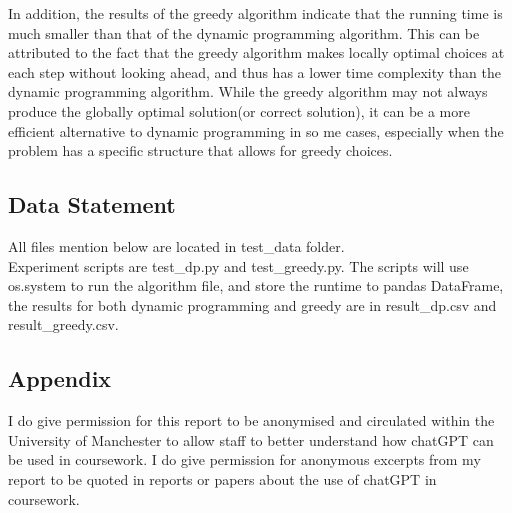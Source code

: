\documentclass[a4]{article}
\begin{document}
\noindent In addition, the results of the greedy algorithm indicate that the running time is much smaller than that of the dynamic programming algorithm. This can be attributed to the fact that the greedy algorithm makes locally optimal choices at each step without looking ahead, and thus has a lower time complexity than the dynamic programming algorithm. While the greedy algorithm may not always produce the globally optimal solution(or correct solution), it can be a more efficient alternative to dynamic programming in so me cases, especially when the problem has a specific structure that allows for greedy choices.

\subsection{Data Statement}
All files mention below are located in test\_data folder.\\

\noindent Experiment scripts are test\_dp.py and test\_greedy.py. The scripts will use os.system to run the algorithm file, and store the runtime to pandas DataFrame, the results for both dynamic programming and greedy are in result\_dp.csv and result\_greedy.csv.\\

\subsection{Appendix}

I do give permission for this report to be anonymised and circulated within the University of Manchester to allow staff to better understand how chatGPT can be used in coursework.  I do give permission for anonymous excerpts from my report to be quoted in reports or papers about the use of chatGPT in coursework.

\end{document}
